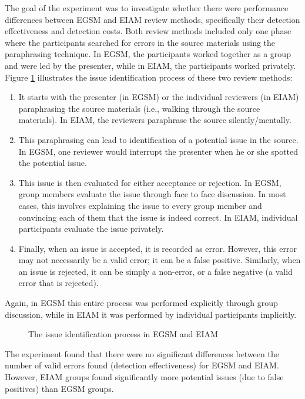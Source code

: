 The goal of the experiment was to investigate whether there were
performance differences between EGSM and EIAM review methods,
specifically their detection effectiveness and detection costs. Both
review methods included only one phase
where the participants searched for errors in the source materials
using the paraphrasing technique. In EGSM, the participants worked
together as a group and were led by the presenter, while in EIAM, the
participants worked privately.  
Figure \ref{fig:review-model} illustrates the issue identification process
of these two review methods:
\begin{enumerate}
\item It starts with the presenter (in EGSM) or the individual
reviewers (in EIAM) paraphrasing the source materials 
(i.e., walking through the source materials). In
EIAM, the reviewers paraphrase the source silently/mentally.
\item This paraphrasing can lead to identification of a potential 
issue in the source. In EGSM, one reviewer would interrupt the
presenter when he or she spotted the potential issue.
\item This issue is then evaluated for either acceptance or
rejection. In EGSM, group members evaluate the issue through face
to face discussion. In most cases, this involves explaining the issue to
every group member and convincing each of them that the issue is indeed
correct. In EIAM, individual participants evaluate the
issue privately. 
\item Finally, when an issue is accepted, it is recorded as
error. However, this error may not necessarily be
a valid error; it can be a false positive.
Similarly, when an issue is rejected, it can be simply
a non-error, or a false negative (a valid error that is rejected).
\end{enumerate}
Again, in EGSM this entire process was performed explicitly through
group  discussion, while in EIAM it was performed by individual
participants implicitly.

\begin{figure}[htb]
 {\centerline{}}
 \caption{The issue identification process in EGSM and EIAM}
 \label{fig:review-model}
\end{figure}


The experiment found that there were no significant differences
between the number of valid errors found (detection effectiveness) for
EGSM and EIAM. However, EIAM groups found significantly more potential issues
(due to false positives) than EGSM groups. 

